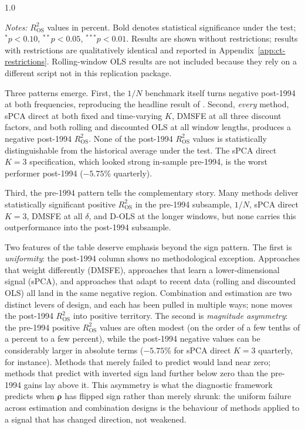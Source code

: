 \documentclass[a4paper,11pt]{article}
\begin{document}
\begin{spacing}{1.0}
\begin{table}[H]
\vspace{0.4em}
\begin{minipage}{0.95\textwidth}
\footnotesize
\textit{Notes:} $R^2_{\mathrm{OS}}$ values in percent. Bold denotes
statistical significance under the \citet{clarkwest2007} test; $^{*}\!p < 0.10$,
$^{**}\!p < 0.05$, $^{***}\!p < 0.01$. Results are shown without
\citet{campbellthompson2008} restrictions; results with restrictions are
qualitatively identical and reported in Appendix~\ref{app:ct-restrictions}.
Rolling-window OLS results are not included because they rely on a
different script not in this replication package.
\end{minipage}
\end{table}
\end{spacing}

Three patterns emerge. First, the $1/N$ benchmark itself turns negative
post-1994 at both frequencies, reproducing the headline result of
\citet{denkloffler2024}. Second, \emph{every} method, sPCA direct at
both fixed and time-varying $K$, DMSFE at all three discount factors,
and both rolling and discounted OLS at all window lengths, produces a
negative post-1994 $R^2_{\mathrm{OS}}$. None of the post-1994
$R^2_{\mathrm{OS}}$ values is statistically distinguishable from the
historical average under the \citet{clarkwest2007} test. The sPCA
direct $K=3$ specification, which looked strong in-sample pre-1994, is
the worst performer post-1994 ($-5.75$\% quarterly).

Third, the pre-1994 pattern tells the complementary story. Many methods
deliver statistically significant positive $R^2_{\mathrm{OS}}$ in the
pre-1994 subsample, $1/N$, sPCA direct $K=3$, DMSFE at all $\delta$,
and D-OLS at the longer windows, but none carries this
outperformance into the post-1994 subsample.

Two features of the table deserve emphasis beyond the sign pattern.
The first is \emph{uniformity}: the post-1994 column shows no
methodological exception. Approaches that weight differently (DMSFE),
approaches that learn a lower-dimensional signal (sPCA), and approaches
that adapt to recent data (rolling and discounted OLS) all land in the
same negative region. Combination and estimation are two distinct levers
of design, and each has been pulled in multiple ways; none moves the
post-1994 $R^2_{\mathrm{OS}}$ into positive territory. The second is
\emph{magnitude asymmetry}: the pre-1994 positive $R^2_{\mathrm{OS}}$
values are often modest (on the order of a few tenths of a percent to a
few percent), while the post-1994 negative values can be considerably
larger in absolute terms ($-5.75$\% for sPCA direct $K=3$ quarterly,
for instance). Methods that merely failed to predict would land near
zero; methods that predict with inverted sign land further below zero
than the pre-1994 gains lay above it. This asymmetry is what the
diagnostic framework predicts when $\boldsymbol{\rho}$ has flipped sign
rather than merely shrunk: the uniform failure across estimation and
combination designs is the behaviour of methods applied to a signal
that has changed direction, not weakened.
\end{document}
